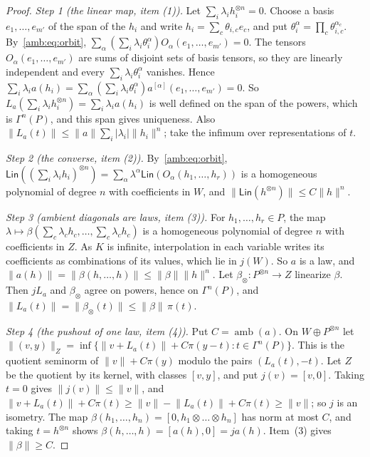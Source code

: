 \documentclass[11pt]{amsart}
\theoremstyle{definition}
\theoremstyle{remark}
\numberwithin{equation}{section}
\newcommand{\abs}[1]{\lvert #1\rvert}
\newcommand{\norm}[1]{\lVert #1\rVert}
\theoremstyle{plain}
\theoremstyle{definition}
\theoremstyle{plain}
\begin{document}
\begin{proof}
\emph{Step 1 (the linear map, item (1)).} Let $\sum_i\lambda_ih_i^{\otimes n}=0$. Choose a basis $e_1,\dots,e_{m'}$ of the span of the $h_i$ and write $h_i=\sum_c\theta_{i,c}e_c$, and put $\theta_i^\alpha=\prod_c\theta_{i,c}^{\alpha_c}$. By~\eqref{amb:eq:orbit}, $\sum_\alpha(\sum_i\lambda_i\theta_i^\alpha)\allowbreak O_\alpha(e_1,\dots,e_{m'})=0$. The tensors $O_\alpha(e_1,\dots,e_{m'})$ are sums of disjoint sets of basis tensors, so they are linearly independent and every $\sum_i\lambda_i\theta_i^\alpha$ vanishes. Hence $\sum_i\lambda_ia(h_i)=\sum_\alpha(\sum_i\lambda_i\theta_i^\alpha)a^{[\alpha]}(e_1,\dots,e_{m'})=0$. So $L_a(\sum_i\lambda_ih_i^{\otimes n})=\sum_i\lambda_ia(h_i)$ is well defined on the span of the powers, which is $\Gamma^n(P)$, and this span gives uniqueness. Also $\norm{L_a(t)}\le\norm a\sum_i\abs{\lambda_i}\norm{h_i}^n$; take the infimum over representations of $t$.

\emph{Step 2 (the converse, item (2)).} By~\eqref{amb:eq:orbit}, $\mathsf{Lin}((\sum_i\lambda_ih_i)^{\otimes n})=\sum_\alpha\lambda^\alpha\mathsf{Lin}(O_\alpha(h_1,\dots,h_r))$ is a homogeneous polynomial of degree $n$ with coefficients in $W$, and $\norm{\mathsf{Lin}(h^{\otimes n})}\le C\norm h^n$.

\emph{Step 3 (ambient diagonals are laws, item (3)).} For $h_1,\dots,h_r\in P$, the map $\lambda\mapsto\beta(\sum_c\lambda_ch_c,\dots,\sum_c\lambda_ch_c)$ is a homogeneous polynomial of degree $n$ with coefficients in $Z$. As $K$ is infinite, interpolation in each variable writes its coefficients as combinations of its values, which lie in $j(W)$. So $a$ is a law, and $\norm{a(h)}=\norm{\beta(h,\dots,h)}\le\norm\beta\norm h^n$. Let $\beta_\otimes\colon P^{\otimes n}\to Z$ linearize $\beta$. Then $jL_a$ and $\beta_\otimes$ agree on powers, hence on $\Gamma^n(P)$, and $\norm{L_a(t)}=\norm{\beta_\otimes(t)}\le\norm\beta\,\pi(t)$.

\emph{Step 4 (the pushout of one law, item (4)).} Put $C=\operatorname{amb}(a)$. On $W\oplus P^{\otimes n}$ let $\norm{(v,y)}_Z=\inf\{\norm{v+L_a(t)}+C\pi(y-t):t\in\Gamma^n(P)\}$. This is the quotient seminorm of $\norm v+C\pi(y)$ modulo the pairs $(L_a(t),-t)$. Let $Z$ be the quotient by its kernel, with classes $[v,y]$, and put $j(v)=[v,0]$. Taking $t=0$ gives $\norm{j(v)}\le\norm v$, and $\norm{v+L_a(t)}+C\pi(t)\ge\norm v-\norm{L_a(t)}+C\pi(t)\ge\norm v$; so $j$ is an isometry. The map $\beta(h_1,\dots,h_n)=[0,h_1\otimes\dots\otimes h_n]$ has norm at most $C$, and taking $t=h^{\otimes n}$ shows $\beta(h,\dots,h)=[a(h),0]=ja(h)$. Item~(3) gives $\norm\beta\ge C$.
\end{proof}
\end{document}
